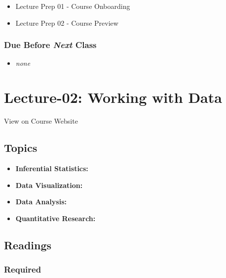\documentclass[]{book}
\providecommand{\tightlist}{%
  \setlength{\itemsep}{0pt}\setlength{\parskip}{0pt}}
\theoremstyle{definition}
\theoremstyle{definition}
\theoremstyle{definition}
\theoremstyle{remark}
\begin{document}
\begin{itemize}
\tightlist
\item
  Lecture Prep 01 - Course Onboarding
\item
  Lecture Prep 02 - Course Preview
\end{itemize}

\subsubsection*{\texorpdfstring{Due Before \emph{Next}
Class}{Due Before Next Class}}\label{due-before-next-class-1}

\begin{itemize}
\tightlist
\item
  \emph{none}
\end{itemize}

\section{Lecture-02: Working with
Data}\label{lecture-02-working-with-data}

View on Course Website

\subsection*{Topics}\label{topics-2}

\begin{itemize}
\tightlist
\item
  \textbf{Inferential Statistics:}
\item
  \textbf{Data Visualization:}
\item
  \textbf{Data Analysis:}
\item
  \textbf{Quantitative Research:}
\end{itemize}

\subsection*{Readings}\label{readings-3}

\subsubsection*{Required}\label{required-2}
\end{document}
